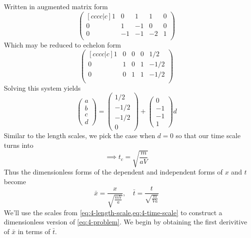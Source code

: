 \documentclass[12pt]{article}
\begin{document}
Written in augmented matrix form
\begin{equation*}
  \begin{pmatrix}[cccc|c]
    1 & 0 & 1 & 1 & 0 \\
    0 & 1 & -1 & 0 & 0 \\
    0 & -1 & -1 & -2 & 1 \\
  \end{pmatrix}
\end{equation*}
Which may be reduced to echelon form
\begin{equation*}
  \begin{pmatrix}[cccc|c]
    1 & 0 & 0 & 0 & 1/2 \\
    0 & 1 & 0 & 1 & -1/2 \\
    0 & 0 & 1 & 1 & -1/2 \\
  \end{pmatrix}
\end{equation*}
Solving this system yields
\begin{equation*}
  \begin{pmatrix}
    a \\ b \\ c \\ d
  \end{pmatrix} =
  \begin{pmatrix}
    1/2 \\ -1/2 \\ -1/2 \\ 0
  \end{pmatrix} +
  \begin{pmatrix}
    0 \\ -1 \\ -1 \\ 1
  \end{pmatrix}
  d
\end{equation*}
Similar to the length scales, we pick the case when $d=0$ so that our time scale
turns into
\begin{equation}
  \label{eq:4-time-scale}
  \implies t_c = \sqrt{\frac{m}{aV}}
\end{equation}
Thus the dimensionless forms of the dependent and independent forms of $x$ and
$t$ become
\begin{equation*}
  \bar{x} = \frac{x}{\sqrt{\frac{mV}{a}}}, \quad
  \bar{t} = \frac{t}{\sqrt{\frac{m}{Va}}}
\end{equation*}
We'll use the scales from \cref{eq:4-length-scale,eq:4-time-scale} to construct
a dimensionless version of \cref{eq:4-problem}. We begin by obtaining the first
derivitive of $\bar{x}$ in terms of $\bar{t}$.
\end{document}
